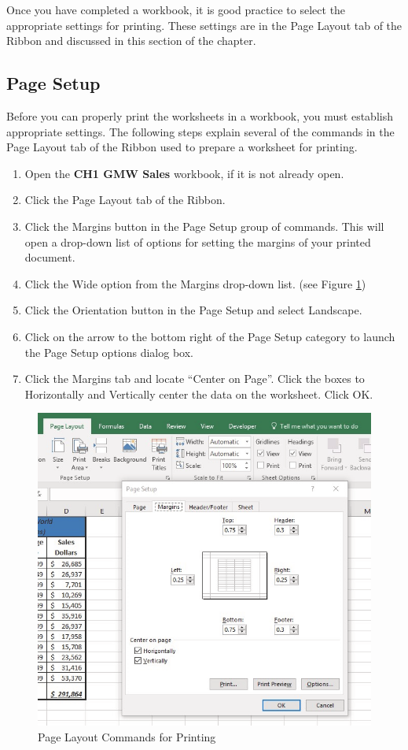 Once you have completed a workbook, it is good practice to select the appropriate settings for printing. These settings are in the Page Layout tab of the Ribbon and discussed in this section of the chapter.

\subsection{Page Setup}

Before you can properly print the worksheets in a workbook, you must establish appropriate settings. The following steps explain several of the commands in the Page Layout tab of the Ribbon used to prepare a worksheet for printing.

\begin{enumerate}
	\item Open the \textbf{CH1 GMW Sales} workbook, if it is not already open.
	\item Click the Page Layout tab of the Ribbon.
	\item Click the Margins button in the Page Setup group of commands. This will open a drop-down list of options for setting the margins of your printed document.
	\item Click the Wide option from the Margins drop-down list. (see Figure \ref{01:fig49})
	\item Click the Orientation button in the Page Setup and select Landscape.
	\item Click on the arrow to the bottom right of the Page Setup category to launch the Page Setup options dialog box.
	\item Click the Margins tab and locate ``Center on Page''. Click the boxes to Horizontally and Vertically center the data on the worksheet. Click OK.

\end{enumerate}

\begin{figure}[H]
	\centering
	\includegraphics[width=\maxwidth{.95\linewidth}]{gfx/ch01_fig49}
	\caption{Page Layout Commands for Printing}
	\label{01:fig49}
\end{figure}

